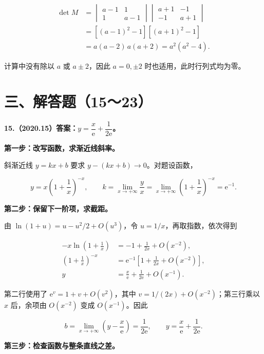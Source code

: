 \documentclass[UTF8,11pt,fontset=windows]{ctexart}
\begin{document}
$$
\begin{aligned}
\det M
&=\begin{vmatrix}a-1&1\\1&a-1\end{vmatrix}
  \begin{vmatrix}a+1&-1\\-1&a+1\end{vmatrix}\\
&=[(a-1)^2-1][(a+1)^2-1]\\
&=a(a-2)\,a(a+2)=\boxed{a^2(a^2-4)}.
\end{aligned}
$$

计算中没有除以 $a$ 或 $a\pm2$，因此 $a=0,\pm2$ 时也适用，此时行列式均为零。

\clearpage

\section*{三、解答题（15～23）}

\textbf{15.（2020.15）答案：$y=\dfrac{x}{\mathrm e}+\dfrac1{2\mathrm e}$。}

\textbf{第一步：改写函数，求渐近线斜率。}

斜渐近线 $y=kx+b$ 要求 $y-(kx+b)\to0$。对题设函数，

$$
y=x\left(1+\frac1x\right)^{-x},
\qquad k=\lim_{x\to+\infty}\frac yx
=\lim_{x\to+\infty}\left(1+\frac1x\right)^{-x}=\mathrm e^{-1}.
$$

\textbf{第二步：保留下一阶项，求截距。}

由 $\ln(1+u)=u-u^2/2+O(u^3)$，令 $u=1/x$，再取指数，依次得到

$$
\begin{aligned}
-x\ln\left(1+\frac1x\right)
&=-1+\frac1{2x}+O(x^{-2}),\\
\left(1+\frac1x\right)^{-x}
&=\mathrm e^{-1}\left[1+\frac1{2x}+O(x^{-2})\right],\\
y&=\frac{x}{\mathrm e}+\frac1{2\mathrm e}+O(x^{-1}).
\end{aligned}
$$

第二行使用了 $\mathrm e^v=1+v+O(v^2)$，其中 $v=1/(2x)+O(x^{-2})$；第三行乘以 $x$ 后，余项由 $O(x^{-2})$ 变成 $O(x^{-1})$。因此

$$
b=\lim_{x\to+\infty}\left(y-\frac{x}{\mathrm e}\right)=\frac1{2\mathrm e},
\qquad \boxed{y=\frac{x}{\mathrm e}+\frac1{2\mathrm e}}.
$$

\textbf{第三步：检查函数与整条直线之差。}
\end{document}
